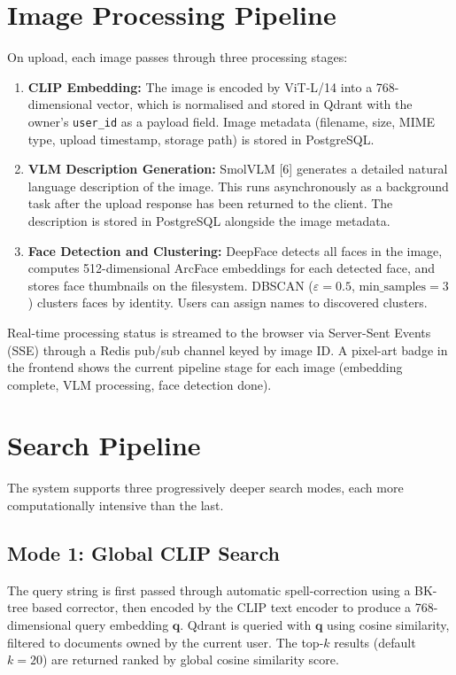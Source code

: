 \documentclass[12pt,a4paper,oneside]{report}
\begin{document}
\section{Image Processing Pipeline}

On upload, each image passes through three processing stages:

\begin{enumerate}[leftmargin=*]
  \item \textbf{CLIP Embedding:} The image is encoded by ViT-L/14 into a 768-dimensional vector, which is normalised and stored in Qdrant with the owner's \texttt{user\_id} as a payload field. Image metadata (filename, size, MIME type, upload timestamp, storage path) is stored in PostgreSQL.
  \item \textbf{VLM Description Generation:} SmolVLM [6] generates a detailed natural language description of the image. This runs asynchronously as a background task after the upload response has been returned to the client. The description is stored in PostgreSQL alongside the image metadata.
  \item \textbf{Face Detection and Clustering:} DeepFace detects all faces in the image, computes 512-dimensional ArcFace embeddings for each detected face, and stores face thumbnails on the filesystem. DBSCAN ($\varepsilon = 0.5$, $\text{min\_samples} = 3$) clusters faces by identity. Users can assign names to discovered clusters.
\end{enumerate}

Real-time processing status is streamed to the browser via Server-Sent Events (SSE) through a Redis pub/sub channel keyed by image ID. A pixel-art badge in the frontend shows the current pipeline stage for each image (embedding complete, VLM processing, face detection done).

\section{Search Pipeline}

The system supports three progressively deeper search modes, each more computationally intensive than the last.

\subsection{Mode 1: Global CLIP Search}

The query string is first passed through automatic spell-correction using a BK-tree based corrector, then encoded by the CLIP text encoder to produce a 768-dimensional query embedding $\mathbf{q}$. Qdrant is queried with $\mathbf{q}$ using cosine similarity, filtered to documents owned by the current user. The top-$k$ results (default $k = 20$) are returned ranked by global cosine similarity score.
\end{document}
